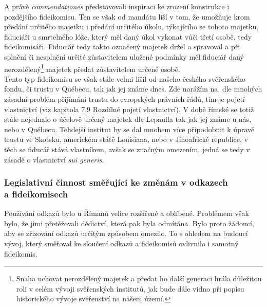 \documentclass{article}
\begin{document}
A právě \textit{commendationes} představovali inspiraci ke zrození konstrukce i pozdějšího fideikomisu. Ten se však od mandátu líší v tom, že umožňuje krom předání určitého majetku i předání určitého úkolu, týkajícího se tohoto majetku, fiduciáři u smrtelného lóže, který měl daný úkol vykonat vůči třetí osobě, tedy fideikomisáři. Fiduciář tedy takto označený majetek držel a spravoval a při splnění či nesplnění určité zůstavitelem uložené podmínky měl fiduciář daný nerozdělený\footnote{Snaha uchovat nerozdělený majetek a předat ho další generaci hrála důležitou roli v celém vývoji svěřenských institutů, jak bude dále vidno při popisu historického vývoje svěřenství na našem území.} majetek předat zůstavitelem určené osobě.\\

Tento typ fideikomisu se však stále velmi lišil od našeho českého svěřenského fondu, či trustu v Québecu, tak jak jej známe dnes. Zde narážím na, dle mnohých zásadní problém přijímání trustu do evropských právních řádů, tím je pojetí vlastnictví (viz kapitola 7.9 Rozdílné pojetí vlastnictví). V době římské se totiž stále nejednalo o účelově určený majetek dle Lepaulla tak jak jej známe u nás, nebo v Québecu. Tehdejší institut by se dal mnohem více připodobnit k úpravě trustu ve Skotsku, americkém státě Louisiana, nebo v Jihoafrické republice, v těch se fiducář stává vlastníkem, avšak se značným omezením, jedná se tedy v zásadě o vlastnictví \textit{sui generis}.\\


\subsubsection{Legislativní činnost směřující ke změnám v odkazech\\ a fideikomisech}

Používání odkazů bylo u Římanů velice rozšířené a oblíbené. Problémem však bylo, že jimi přetěžovali dědictví, která pak byla odmítána. Bylo proto žádoucí, aby se zřizování odkazů určitým způsobem omezilo. To s ohledem na budoucí vývoj, který směřoval ke sloučení odkazů a fideikomisů ovlivnilo i samotný fideikomis.\\
\end{document}

